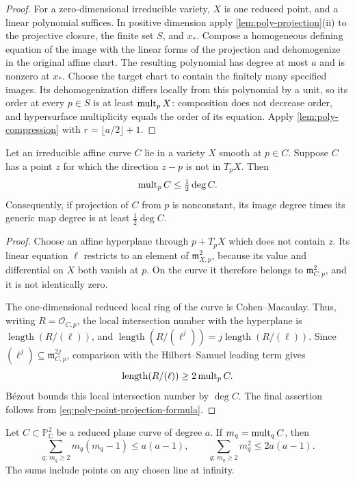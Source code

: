 \begin{proof}
For a zero-dimensional irreducible variety, $X$ is one reduced point, and a linear polynomial suffices.  In positive dimension apply \cref{lem:poly-projection}(ii) to the projective closure, the finite set $S$, and $x_*$.  Compose a homogeneous defining equation of the image with the linear forms of the projection and dehomogenize in the original affine chart.  The resulting polynomial has degree at most $a$ and is nonzero at $x_*$.  Choose the target chart to contain the finitely many specified images.  Its dehomogenization differs locally from this polynomial by a unit, so its order at every $p\in S$ is at least $\operatorname{mult}_pX$: composition does not decrease order, and hypersurface multiplicity equals the order of its equation.  Apply \cref{lem:poly-compression} with $r=\lfloor a/2\rfloor+1$.
\end{proof}

\begin{corollary}
\label{cor:poly-tangent-projection}
Let an irreducible affine curve $C$ lie in a variety $X$ smooth at $p\in C$.  Suppose $C$ has a point $z$ for which the direction $z-p$ is not in $T_pX$.  Then
\[
 \operatorname{mult}_pC\le\tfrac12\deg C.
\]
Consequently, if projection of $C$ from $p$ is nonconstant, its image degree times its generic map degree is at least $\tfrac12\deg C$.
\end{corollary}

\begin{proof}
Choose an affine hyperplane through $p+T_pX$ which does not contain $z$.  Its linear equation $\ell$ restricts to an element of $\mathfrak{m}_{X,p}^2$, because its value and differential on $X$ both vanish at $p$.  On the curve it therefore belongs to $\mathfrak{m}_{C,p}^2$, and it is not identically zero.

The one-dimensional reduced local ring of the curve is Cohen--Macaulay.  Thus, writing $R=\mathcal{O}_{C,p}$, the local intersection number with the hyperplane is $\operatorname{length}(R/(\ell))$, and $\operatorname{length}(R/(\ell^j))= j\operatorname{length}(R/(\ell))$. Since $(\ell^j)\subseteq\mathfrak{m}_{C,p}^{2j}$, comparison with the Hilbert--Samuel leading term gives
\[
 \operatorname{length}(R/(\ell))\ge2\operatorname{mult}_pC.
\]
B\'ezout bounds this local intersection number by $\deg C$. The final assertion follows from \eqref{eq:poly-point-projection-formula}.
\end{proof}

\begin{lemma}\label{lem:poly-polar}
Let $C\subset\mathbb{P}^2_{\mathbb{C}}$ be a reduced plane curve of degree $a$. If $m_q=\operatorname{mult}_qC$, then
\begin{equation}\label{eq:poly-polar-sum}
 \sum_{q:\,m_q\ge2}m_q(m_q-1)\le a(a-1),
 \qquad
 \sum_{q:\,m_q\ge2}m_q^2\le2a(a-1).
\end{equation}
The sums include points on any chosen line at infinity.
\end{lemma}

